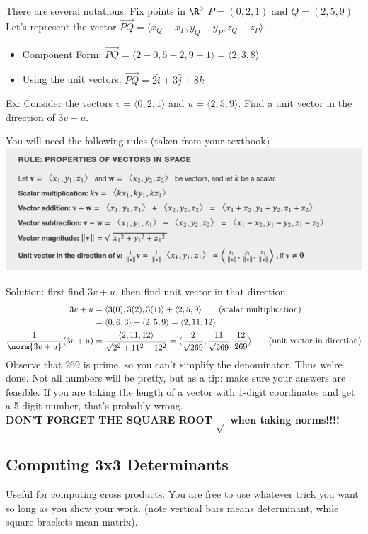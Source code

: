 \documentclass[]{mangos-musings}
\begin{document}
There are several notations. Fix points in $\R^3$ $P = (0, 2, 1)$ and $Q = (2, 5, 9)$
\\ Let's represent the vector $\overrightarrow{PQ} = \langle x_Q - x_P, y_Q - y_P, z_Q - z_P\rangle$.
\begin{itemize}
  \item Component Form: $\overrightarrow{PQ} = \langle 2-0, 5-2, 9-1\rangle = \langle 2, 3, 8\rangle$
  \item Using the unit vectors: $\overrightarrow{PQ} = 2\hat{i} + 3\hat{j} + 8\hat{k}$
\end{itemize}

Ex: Consider the vectors $v = \langle 0, 2, 1\rangle$ and $u = \langle 2, 5, 9\rangle$. Find a unit vector in the direction of $3v + u$. 

You will need the following rules (taken from your textbook)
\\ \includegraphics{assets/rec01-vectorspace.png}

Solution: first find $3v + u$, then find unit vector in that direction.
\begin{align*}
  3v + u &= \langle 3(0), 3(2), 3(1)\rangle + \langle 2, 5, 9\rangle \tag{scalar multiplication}
  \\ &=  \langle 0, 6, 3\rangle +  \langle 2, 5, 9\rangle 
  = \langle 2, 11, 12\rangle
  \\ \dfrac{1}{\norm{3v + u}} (3v + u) &= \dfrac{\langle 2, 11, 12\rangle}{\sqrt{2^2 + 11^2 + 12^2}} =  \langle \dfrac{2}{\sqrt{269}}, \dfrac{11}{\sqrt{269}}, \dfrac{12}{269}\rangle \tag{unit vector in direction}
\end{align*}
Observe that $269$ is prime, so you can't simplify the denominator. Thus we're done. Not all numbers will be pretty, but as a tip: make sure your answers are feasible. If you are taking the length of a vector with 1-digit coordinates and get a 5-digit number, that's probably wrong. 
\\ \textbf{DON'T FORGET THE SQUARE ROOT $\sqrt{}$ when taking norms!!!!}

\newpage
\subsection*{Computing 3x3 Determinants}
Useful for computing cross products. You are free to use whatever trick you want so long as you show your work. (note vertical bars means determinant, while square brackets mean matrix). 
\end{document}
